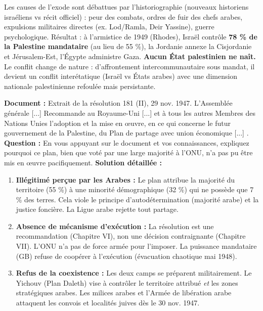 \documentclass[11pt]{article}
\begin{document}
Les causes de l'exode sont d\'ebattues par l'historiographie (nouveaux historiens isra\'eliens vs r\'ecit officiel) : peur des combats, ordres de fuir des chefs arabes, expulsions militaires directes (ex. Lod/Ramla, Deir Yassine), guerre psychologique. R\'esultat : \`a l'armistice de 1949 (Rhodes), Isra\"el contr\^ole \textbf{78 \% de la Palestine mandataire} (au lieu de 55 \%), la Jordanie annexe la Cisjordanie et J\'erusalem-Est, l'\'Egypte administre Gaza. \textbf{Aucun \'Etat palestinien ne na\^it.} Le conflit change de nature : d'affrontement intercommunautaire sous mandat, il devient un conflit inter\'etatique (Isra\"el vs \'Etats arabes) avec une dimension nationale palestinienne refoul\'ee mais persistante.

\begin{exoresolu}
\textbf{Document :} Extrait de la r\'esolution 181 (II), 29 nov. 1947. \guillemotleft L'Assembl\'ee g\'en\'erale [...] Recommande au Royaume-Uni [...] et \`a tous les autres Membres des Nations Unies l'adoption et la mise en \oe{}uvre, en ce qui concerne le futur gouvernement de la Palestine, du Plan de partage avec union \'economique [...] \guillemotright.
\textbf{Question :} En vous appuyant sur le document et vos connaissances, expliquez pourquoi ce plan, bien que vot\'e par une large majorit\'e \`a l'ONU, n'a pas pu \^etre mis en \oe{}uvre pacifiquement.
\textbf{Solution détaillée :}
\begin{enumerate}
    \item \textbf{Ill\'egitim\'e per\c{c}ue par les Arabes :} Le plan attribue la majorit\'e du territoire (55 \%) \`a une minorit\'e d\'emographique (32 \%) qui ne poss\`ede que 7 \% des terres. Cela viole le principe d'autod\'etermination (majorit\'e arabe) et la justice fonci\`ere. La Ligue arabe rejette tout partage.
    \item \textbf{Absence de m\'ecanisme d'ex\'ecution :} La r\'esolution est une recommandation (Chapitre VI), non une d\'ecision contraignante (Chapitre VII). L'ONU n'a pas de force arm\'ee pour l'imposer. La puissance mandataire (GB) refuse de coop\'erer \`a l'ex\'ecution (\'evacuation chaotique mai 1948).
    \item \textbf{Refus de la coexistence :} Les deux camps se pr\'eparent militairement. Le Yichouv (Plan Daleth) vise \`a contr\^oler le territoire attribu\'e \emph{et} les zones strat\'egiques arabes. Les milices arabes et l'Arm\'ee de lib\'eration arabe attaquent les convois et localit\'es juives d\`es le 30 nov. 1947.

\end{enumerate}
\end{exoresolu}
\end{document}
